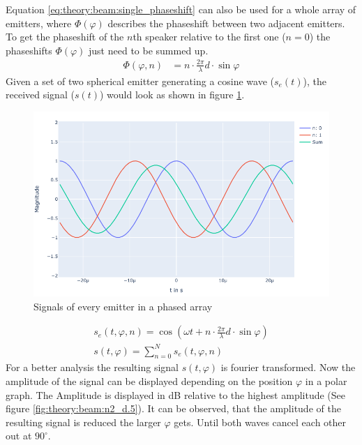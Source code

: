 %
Equation \ref{eq:theory:beam:single_phaseshift} can also be used for a whole array of emitters, where $\Phi(\varphi)$ describes the phaseshift between two adjacent emitters. To get the phaseshift of the $n$th speaker relative to the first one ($n=0$) the phaseshifts $\Phi(\varphi)$ just need to be summed up.
%
\begin{align}
  \Phi(\varphi, n) &= n \cdot \frac{2\pi}{\lambda} d \cdot \sin \varphi
\end{align}
%
Given a set of two spherical emitter generating a cosine wave (\(s_e(t)\)), the received signal (\(s(t)\)) would look as shown in figure \ref{fig:theory:beam:time}.
%
\begin{figure}
  \centering
  \includegraphics[height=\mediumheight]{src/assets/pictures/theory/beam_time_n2_45deg.png}
  \caption{Signals of every emitter in a phased array}
  \label{fig:theory:beam:time}
\end{figure}
%
\begin{align}
  s_e(t, \varphi, n) = \cos (\omega t + n \cdot \frac{2\pi}{\lambda} d \cdot \sin \varphi )\label{eq:theory:beam:sig}\\[1em]
  s(t, \varphi) = \sum_{n = 0}^{N} s_e(t, \varphi, n)
\end{align}
%
For a better analysis the resulting signal \(s(t, \varphi)\) is fourier transformed. Now the amplitude of the signal can be displayed depending on the position \(\varphi\) in a polar graph. The Amplitude is displayed in dB relative to the highest amplitude (See figure \ref{fig:theory:beam:n2_d.5}).\p
It can be observed, that the amplitude of the resulting signal is reduced the larger \(\varphi\) gets. Until both waves cancel each other out at \(90^\circ\).
%
